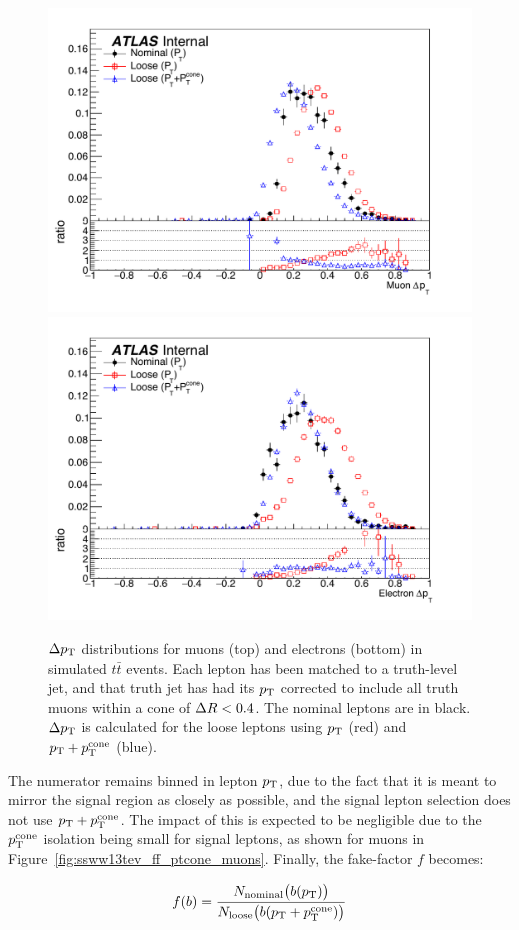 \begin{figure}[htbp]
  \centering
  \includegraphics[width=.6\textwidth]{figs/ssww_13tev/backgrounds/ff/dpt_muon_ttbar}\\
  \includegraphics[width=.6\textwidth]{figs/ssww_13tev/backgrounds/ff/dpt_elec_ttbar}
  \caption{$\Delta p_{\mathrm{T}}$ distributions for muons (top) and electrons (bottom) in simulated $t\bar{t}$ events.  Each lepton has been matched to a truth-level jet, and that truth jet has had its $p_{\mathrm{T}}$ corrected to include all truth muons within a cone of $\Delta R < 0.4$.  The nominal leptons are in black. $\Delta p_{\mathrm{T}}$ is calculated for the loose leptons using $p_{\mathrm{T}}$ (red) and $p_{\mathrm{T}}+p_{\mathrm{T}}^{\textrm{cone}}$ (blue).}
  \label{fig:ssww13tev_ff_deltapt_ptcone}
\end{figure}

The numerator remains binned in lepton $p_{\mathrm{T}}$, due to the fact that it is meant to mirror the signal region as closely as possible, and the signal lepton selection does not use $p_{\mathrm{T}}+p_{\mathrm{T}}^{\textrm{cone}}$.
The impact of this is expected to be negligible due to the $p_{\mathrm{T}}^{\textrm{cone}}$ isolation being small for signal leptons, as shown for muons in Figure~\ref{fig:ssww13tev_ff_ptcone_muons}.
Finally, the fake-factor $f$ becomes:

\begin{equation}
f(b) = \frac{N_{\textrm{nominal}}\big(b(\pt)\big)}{N_{\textrm{loose}}\big(b(\ptptcone)\big)}
\label{eq:ssww13tev_ff_ptcone_binned}
\end{equation}

